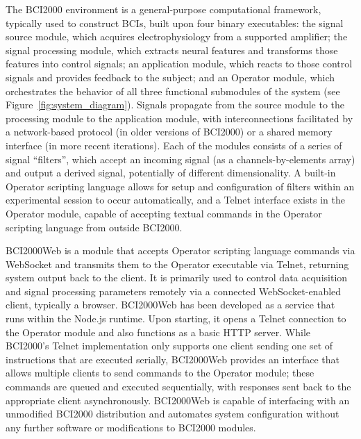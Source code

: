 \documentclass[utf8]{frontiersSCNS}
\begin{document}
The BCI2000 environment is a general-purpose computational framework, typically used to construct BCIs, built upon four binary executables: the signal source module, which acquires electrophysiology from a supported amplifier; the signal processing module, which extracts neural features and transforms those features into control signals; an application module, which reacts to those control signals and provides feedback to the subject; and an Operator module, which orchestrates the behavior of all three functional submodules of the system (see Figure~\ref{fig:system_diagram}).
Signals propagate from the source module to the processing module to the application module, with interconnections facilitated by a network-based protocol (in older versions of BCI2000) or a shared memory interface (in more recent iterations).
Each of the modules consists of a series of signal ``filters'', which accept an incoming signal (as a channels-by-elements array) and output a derived signal, potentially of different dimensionality.
A built-in Operator scripting language allows for setup and configuration of filters within an experimental session to occur automatically, and a Telnet interface exists in the Operator module, capable of accepting textual commands in the Operator scripting language from outside BCI2000.

BCI2000Web is a module that accepts Operator scripting language commands via WebSocket and transmits them to the Operator executable via Telnet, returning system output back to the client.
It is primarily used to control data acquisition and signal processing parameters remotely via a connected WebSocket-enabled client, typically a browser.
BCI2000Web has been developed as a service that runs within the Node.js runtime.
Upon starting, it opens a Telnet connection to the Operator module and also functions as a basic HTTP server.
While BCI2000's Telnet implementation only supports one client sending one set of instructions that are executed serially, BCI2000Web provides an interface that allows multiple clients to send commands to the Operator module; these commands are queued and executed sequentially, with responses sent back to the appropriate client asynchronously.
BCI2000Web is capable of interfacing with an unmodified BCI2000 distribution and automates system configuration without any further software or modifications to BCI2000 modules.
\end{document}
